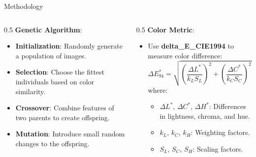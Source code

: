 \begin{frame}{Methodology}
    \begin{columns}
        \begin{column}{0.5\textwidth}
            \textbf{Genetic Algorithm}:
            \begin{itemize}
                \item \textbf{Initialization}: Randomly generate a population of images.
                \item \textbf{Selection}: Choose the fittest individuals based on color similarity.
                \item \textbf{Crossover}: Combine features of two parents to create offspring.
                \item \textbf{Mutation}: Introduce small random changes to the offspring.
            \end{itemize}
        \end{column}
        \begin{column}{0.5\textwidth}
            \textbf{Color Metric}:
            \begin{itemize}
                \item Use \textbf{delta\_E\_CIE1994} to measure color difference:
                      \[
                          \Delta E_{94}^* = \sqrt{\left(\frac{\Delta L^*}{k_L S_L}\right)^2 + \left(\frac{\Delta C^*}{k_C S_C}\right)^2 + \left(\frac{\Delta H^*}{k_H S_H}\right)^2}
                      \]
                      where:
                      \begin{itemize}
                          \item \(\Delta L^*\), \(\Delta C^*\), \(\Delta H^*\): Differences in lightness, chroma, and hue.
                          \item \(k_L\), \(k_C\), \(k_H\): Weighting factors.
                          \item \(S_L\), \(S_C\), \(S_H\): Scaling factors.
                      \end{itemize}
            \end{itemize}
        \end{column}
    \end{columns}
\end{frame}


